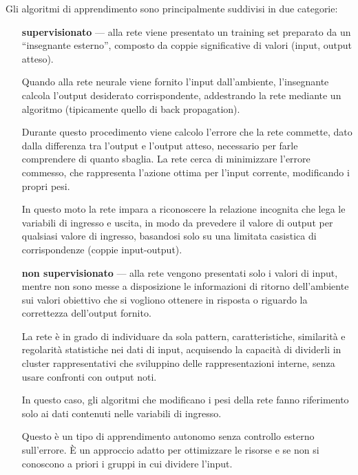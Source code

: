 Gli algoritmi di apprendimento sono principalmente suddivisi in due categorie:
\begin{itemize}
	\item[\bfseries supervisionato] --- alla rete viene presentato un training set preparato da un ``insegnante esterno'', composto da coppie significative di valori (input, output atteso).
	
	Quando alla rete neurale viene fornito l'input dall'ambiente, l'insegnante calcola l'output desiderato corrispondente, addestrando la rete mediante un algoritmo (tipicamente quello di back propagation). 
	
	Durante questo procedimento viene calcolo l'errore che la rete commette, dato dalla differenza tra l'output e l'output atteso, necessario per farle comprendere di quanto sbaglia. La rete cerca di minimizzare l'errore commesso, che rappresenta l'azione ottima per l'input corrente, modificando i propri pesi.
	
	In questo moto la rete impara a riconoscere la relazione incognita che lega le variabili di ingresso e uscita, in modo da prevedere il valore di output per qualsiasi valore di ingresso, basandosi solo su una limitata casistica di corrispondenze (coppie input-output).
	
	\item[\bfseries non supervisionato] --- alla rete vengono presentati solo i valori di input, mentre non sono messe a disposizione le informazioni di ritorno dell'ambiente sui valori obiettivo che si vogliono ottenere in risposta o riguardo la correttezza dell'output fornito.
	
	La rete è in grado di individuare da sola pattern, caratteristiche, similarità e regolarità statistiche nei dati di input, acquisendo la capacità di dividerli in cluster rappresentativi che sviluppino delle rappresentazioni interne, senza usare confronti con output noti.
	
	In questo caso, gli algoritmi che modificano i pesi della rete fanno riferimento solo ai dati contenuti nelle variabili di ingresso.
	
	Questo è un tipo di apprendimento autonomo senza controllo esterno sull'errore. È un approccio adatto per ottimizzare le risorse e se non si conoscono a priori i gruppi in cui dividere l'input.
\end{itemize}

